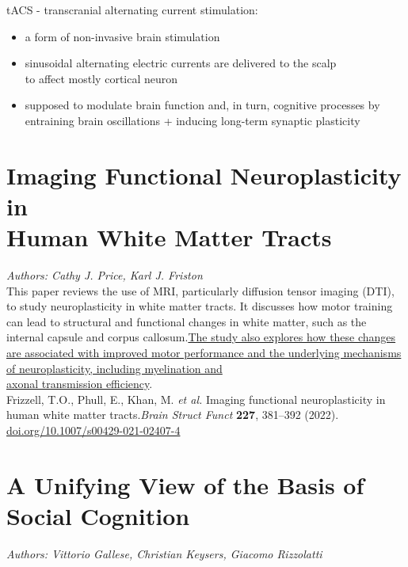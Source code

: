 \documentclass[12pt]{article}
\begin{document}
\noindent tACS - transcranial alternating current stimulation:

\begin{itemize}
    \item a form of non-invasive brain stimulation
    \item sinusoidal alternating electric currents are delivered to the scalp\\to affect mostly cortical neuron
    \item supposed to modulate brain function and, in turn, cognitive processes by entraining brain oscillations + inducing long-term synaptic plasticity
\end{itemize}

\section{Imaging Functional Neuroplasticity in\\Human White Matter Tracts}
\noindent\textit{Authors: Cathy J. Price, Karl J. Friston}\\

\noindent This paper reviews the use of MRI, particularly diffusion tensor imaging (DTI), to study neuroplasticity in white matter tracts. It discusses how motor training can lead to structural and functional changes in white matter, such as the internal capsule and corpus callosum.\href{https://www.frontiersin.org/journals/neuroscience/articles/10.3389/fnins.2024.1441002/full}{The study also explores how these changes are associated with improved motor performance and the underlying mechanisms of neuroplasticity, including myelination and\\axonal transmission efficiency}.\\

\noindent Frizzell, T.O., Phull, E., Khan, M. \textit{et al.} Imaging functional neuroplasticity in human white matter tracts.\textit{Brain Struct Funct} \textbf{227}, 381–392 (2022). \href{https://doi.org/10.1007/s00429-021-02407-4}{doi.org/10.1007/s00429-021-02407-4} 

\section{A Unifying View of the Basis of\\Social Cognition}

\noindent\textit{Authors: Vittorio Gallese, Christian Keysers, Giacomo Rizzolatti}\\
\end{document}
